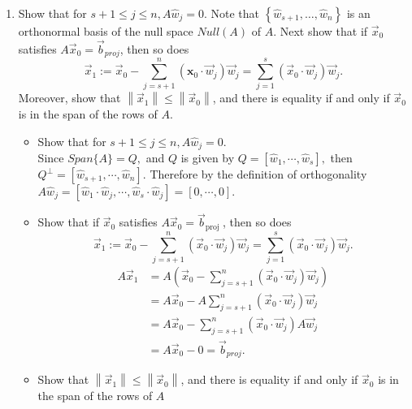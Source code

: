 \documentclass[12pt, letterpaper]{article}
\begin{document}
\begin{enumerate}
		\item Show that for $s+1 \leq j \leq n, A \hat{w}_j=0$. Note that $\left\{\hat{w}_{s+1}, \ldots, \hat{w}_n\right\}$ is an orthonormal basis of the null space ${Null}(A)$ of $A$. Next show that if $\vec{x}_0$ satisfies $A \vec{x}_0=\vec{b}_{{proj }}$, then so does
$$
\vec{x}_1:=\vec{x}_0-\sum_{j=s+1}^n\left(\mathbf{x}_0 \cdot \vec{w}_j\right) \vec{w}_j=\sum_{j=1}^s\left(\vec{x}_0 \cdot \vec{w}_j\right) \vec{w}_j .
$$
Moreover, show that $\left\|\vec{x}_1\right\| \leq\left\|\vec{x}_0\right\|$, and there is equality if and only if $\vec{x}_0$ is in the span of the rows of $A$.
		\begin{itemize}
			\item Show that for $s+1 \leq j \leq n, A \hat{w}_j=0$.\\
			Since $Span\{A\} = Q,$ and $Q$ is given by $Q=[\hat{w}_1,\cdots,\hat{w}_s],$ then $Q^\perp = [\hat{w}_{s+1},\cdots,\hat{w}_n]$.  Therefore by the definition of orthogonality $A \hat{w}_j = [\hat{w}_1 \cdot  \hat{w}_j,\cdots,\hat{w}_s \cdot  \hat{w}_j]= [0,\cdots, 0].$
			\item Show that if $\vec{x}_0$ satisfies $A \vec{x}_0=\vec{b}_{\text {proj }}$, then so does
$$
\vec{x}_1:=\vec{x}_0-\sum_{j=s+1}^n\left(\vec{x}_0 \cdot \vec{w}_j\right) \vec{w}_j=\sum_{j=1}^s\left(\vec{x}_0 \cdot \vec{w}_j\right) \vec{w}_j .
$$
		\begin{align*}
			A \vec{x}_1 &= A(\vec{x}_0-\sum_{j=s+1}^n\left(\vec{x}_0 \cdot \vec{w}_j\right) \vec{w}_j)\\
			&= A\vec{x}_0 - A \sum_{j=s+1}^n\left(\vec{x}_0 \cdot \vec{w}_j\right) \vec{w}_j\\
			&=  A\vec{x}_0 - \sum_{j=s+1}^n\left(\vec{x}_0 \cdot \vec{w}_j\right) A \vec{w}_j\\
			&= A \vec{x}_0 - 0= \vec{b}_{proj}.
		\end{align*}
		\item Show that $\left\|\vec{x}_1\right\| \leq\left\|\vec{x}_0\right\|$, and there is equality if and only if $\vec{x}_0$ is in the span of the rows of $A$\\

\end{itemize}
\end{enumerate}
\end{document}
